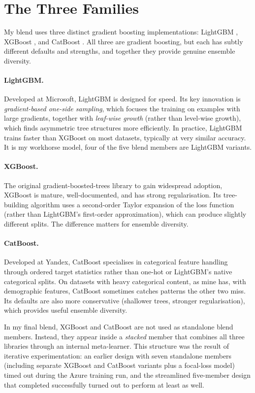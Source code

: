 \section{The Three Families}

My blend uses three distinct gradient boosting implementations: LightGBM \citep{ke2017lightgbm}, XGBoost \citep{chen2016xgboost}, and CatBoost \citep{prokhorenkova2018catboost}. All three are gradient boosting, but each has subtly different defaults and strengths, and together they provide genuine ensemble diversity.

\paragraph{LightGBM.} Developed at Microsoft, LightGBM is designed for speed. Its key innovation is \emph{gradient-based one-side sampling}, which focuses the training on examples with large gradients, together with \emph{leaf-wise growth} (rather than level-wise growth), which finds asymmetric tree structures more efficiently. In practice, LightGBM trains faster than XGBoost on most datasets, typically at very similar accuracy. It is my workhorse model, four of the five blend members are LightGBM variants.

\paragraph{XGBoost.} The original gradient-boosted-trees library to gain widespread adoption, XGBoost is mature, well-documented, and has strong regularisation. Its tree-building algorithm uses a second-order Taylor expansion of the loss function (rather than LightGBM's first-order approximation), which can produce slightly different splits. The difference matters for ensemble diversity.

\paragraph{CatBoost.} Developed at Yandex, CatBoost specialises in categorical feature handling through ordered target statistics rather than one-hot or LightGBM's native categorical splits. On datasets with heavy categorical content, as mine has, with demographic features, CatBoost sometimes catches patterns the other two miss. Its defaults are also more conservative (shallower trees, stronger regularisation), which provides useful ensemble diversity.

In my final blend, XGBoost and CatBoost are not used as standalone blend members. Instead, they appear inside a \emph{stacked} member that combines all three libraries through an internal meta-learner. This structure was the result of iterative experimentation: an earlier design with seven standalone members (including separate XGBoost and CatBoost variants plus a focal-loss model) timed out during the Azure training run, and the streamlined five-member design that completed successfully turned out to perform at least as well.

